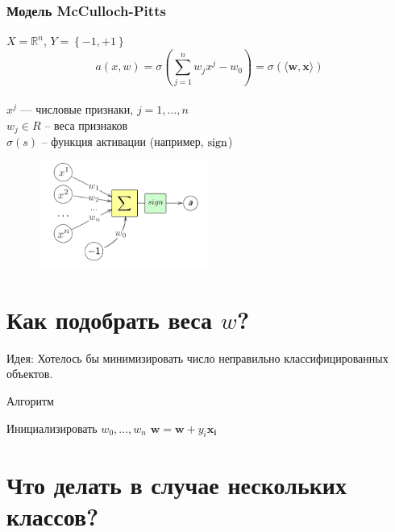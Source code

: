 \documentclass[10pt]{beamer}
\begin{document}
\begin{frame}\frametitle{Модель McCulloch-Pitts}
  $X = \mathbb{R}^n$, ${Y = \left\{ -1, + 1\right\}}$\\
	\pause
	$$a(x,w) = \sigma(\sum\limits_{j=1}^n w_j x^j - w_0) = \sigma(\langle \mathbf{w}, \mathbf{x} \rangle)$$\\
  $x^j$ — числовые признаки, $j = 1,\dots, n$ \\	
	$w_j \in R$ -- веса признаков\\
	$\sigma(s)$ -- функция активации (например, $\operatorname{sign}$)
	\pause
	\begin{figure}[htbp]
	  \includegraphics[height=100pt, keepaspectratio = true]{images/neuron-scheme}   
	\end{figure}
\end{frame}

\section{Как подобрать веса $w$?}

\begin{frame}
  \alert{Идея}: Хотелось бы минимизировать число неправильно классифицированных объектов.
\end{frame}

\begin{frame}{Алгоритм}
	\begin{algorithmic}[1]
            \State Инициализировать ${w_0, \dots, w_n}$
                   \State $\mathbf{w} = \mathbf{w} + y_i \mathbf{x_i}$
                 \EndIf  
               \EndFor
           	\EndRepeat
        \EndFunction
    \end{algorithmic}
\end{frame}

\begin{frame}
\end{frame}

\section{Что делать в случае нескольких классов?}
\end{document}
